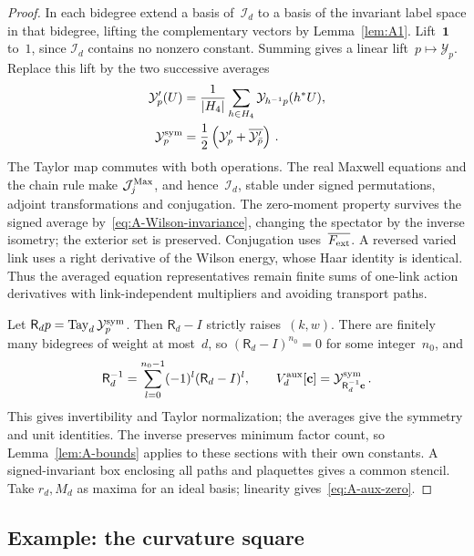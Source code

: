 \begin{proof}
In each bidegree extend a basis of~$\mathcal I_d$ to a basis of the invariant label space in that bidegree, lifting the complementary vectors by Lemma~\ref{lem:A1}. Lift~$\mathbf1$ to~$1$, since $\mathcal I_d$ contains no nonzero constant. Summing gives a linear lift~$p\mapsto\mathcal Y_p$. Replace this lift by the two successive averages
\begin{align*}
\mathcal Y'_p(U)&=\frac1{|H_4|}\sum_{h\in H_4}\mathcal Y_{h^{-1}p}(h^*U),\\
\mathcal Y^{\rm sym}_p&=\frac12\left(\mathcal Y'_p+\overline{\mathcal Y'_{\bar p}}\right)\,.
\end{align*}
The Taylor map commutes with both operations. The real Maxwell equations and the chain rule make $\mathcal J_j^{\rm Max}$, and hence~$\mathcal I_d$, stable under signed permutations, adjoint transformations and conjugation. The zero-moment property survives the signed average by~\eqref{eq:A-Wilson-invariance}, changing the spectator by the inverse isometry; the exterior set is preserved. Conjugation uses~$\overline{F_{\rm ext}}$. A reversed varied link uses a right derivative of the Wilson energy, whose Haar identity is identical. Thus the averaged equation representatives remain finite sums of one-link action derivatives with link-independent multipliers and avoiding transport paths.

Let $\mathsf R_dp=\operatorname{Tay}_{d}\mathcal Y^{\rm sym}_p$. Then $\mathsf R_d-I$ strictly raises~$(k,w)$. There are finitely many bidegrees of weight at most~$d$, so $(\mathsf R_d-I)^{n_0}=0$ for some integer~$n_0$, and
\begin{equation*}
\mathsf R_d^{-1}=\sum_{l=0}^{n_0-1}(-1)^l(\mathsf R_d-I)^l,\qquad
V_d^{\rm aux}[\mathbf c]=\mathcal Y^{\rm sym}_{\mathsf R_d^{-1}\mathbf c}\,.
\end{equation*}
This gives invertibility and Taylor normalization; the averages give the symmetry and unit identities. The inverse preserves minimum factor count, so Lemma~\ref{lem:A-bounds} applies to these sections with their own constants. A signed-invariant box enclosing all paths and plaquettes gives a common stencil. Take $r_d,M_d$ as maxima for an ideal basis; linearity gives~\eqref{eq:A-aux-zero}.
\end{proof}

\subsection{Example: the curvature square}\label{sec:A-example}

